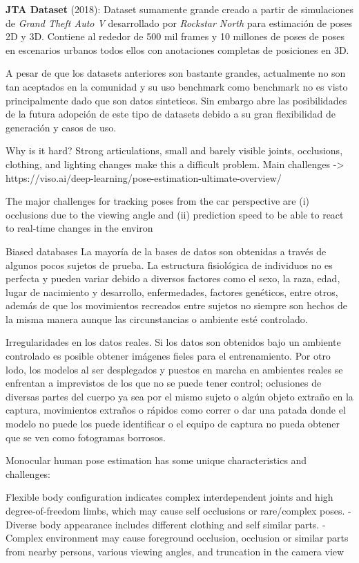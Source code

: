 \textbf{JTA Dataset} (2018): Dataset sumamente grande creado a partir de simulaciones de
\textit{Grand Theft Auto V} desarrollado por \textit{Rockstar North} \cite{fabbri2018learning}
para estimación de poses 2D y 3D. Contiene al
rededor de 500 mil frames y 10 millones de poses de poses en escenarios urbanos todos ellos con
anotaciones completas de posiciones en 3D.

A pesar de que los datasets anteriores son bastante grandes, actualmente no son tan aceptados en la
comunidad y su uso benchmark como benchmark no es visto principalmente dado que son datos sinteticos.
Sin embargo abre las posibilidades de la futura adopción de este tipo de datasets debido a su gran
flexibilidad de generación y casos de uso.

Why is it hard?
Strong articulations, small and barely visible joints, occlusions, clothing, and lighting changes
make this a difficult problem.
Main challenges -> https://viso.ai/deep-learning/pose-estimation-ultimate-overview/

The major challenges for tracking poses from the car perspective are
(i) occlusions due to the viewing angle and (ii) prediction
speed to be able to react to real-time changes in the environ

Biased databases
La mayoría de la bases de datos son obtenidas a través de algunos pocos sujetos de prueba.
La estructura fisiológica de individuos no es perfecta y pueden variar debido a diversos factores
como el sexo, la raza, edad, lugar de nacimiento y desarrollo, enfermedades, factores genéticos, entre
otros, además de que los movimientos recreados entre sujetos no siempre son hechos de la misma manera
aunque las circunstancias o ambiente esté controlado.

Irregularidades en los datos reales.
Si los datos son obtenidos bajo un ambiente controlado es posible obtener imágenes fieles para el
entrenamiento. Por otro lodo, los modelos al ser desplegados y puestos en marcha en ambientes reales
se enfrentan a imprevistos de los que no se puede tener control; oclusiones de diversas partes del
cuerpo ya sea por el mismo sujeto o algún objeto extraño en la captura, movimientos extraños o rápidos
como correr o dar una patada donde el modelo no puede los puede identificar o el equipo de captura
no pueda obtener que se ven como fotogramas borrosos.

Monocular human pose estimation has some unique characteristics
and challenges:

Flexible body configuration indicates complex interdependent
joints and high degree-of-freedom limbs, which may cause self occlusions or rare/complex poses.
- Diverse body appearance includes different clothing and self similar parts.
- Complex environment may cause foreground occlusion, occlusion
or similar parts from nearby persons, various viewing angles, and
truncation in the camera view

